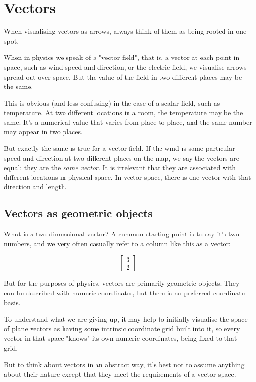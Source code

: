 \chapter{Vectors} \label{ch:vectors}

When visualising vectors as arrows, always think of them as being rooted in one spot.

When in physics we speak of a "vector field", that is, a vector at each point in space, such as wind speed and direction, or the electric field, we visualise arrows spread out over space. But the value of the field in two different places may be the same.

This is obvious (and less confusing) in the case of a scalar field, such as temperature. At two different locations in a room, the temperature may be the same. It's a numerical value that varies from place to place, and the same number may appear in two places.

But exactly the same is true for a vector field. If the wind is some particular speed and direction at two different places on the map, we say the vectors are equal: they are the \textit{same vector}. It is irrelevant that they are associated with different locations in physical space. In vector space, there is one vector with that direction and length.

\section{Vectors as geometric objects}\label{sec:vectors-geometric}

What is a two dimensional vector? A common starting point is to say it's two numbers, and we very often casually refer to a column like this as a vector:

$$
\begin{bmatrix}3 \\ 2\end{bmatrix}
$$

But for the purposes of physics, vectors are primarily geometric objects. They can be described with numeric coordinates, but there is no preferred coordinate basis.

To understand what we are giving up, it may help to initially visualise the space of plane vectors as having some intrinsic coordinate grid built into it, so every vector in that space "knows" its own numeric coordinates, being fixed to that grid.

But to think about vectors in an abstract way, it's best not to assume anything about their nature except that they meet the requirements of a vector space.

